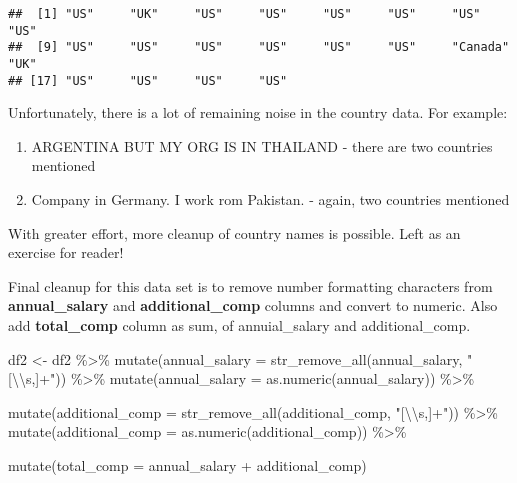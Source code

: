 \documentclass[
]{article}
\newenvironment{Shaded}{\begin{snugshade}}{\end{snugshade}}
\newcommand{\AttributeTok}[1]{\textcolor[rgb]{0.77,0.63,0.00}{#1}}
\newcommand{\DecValTok}[1]{\textcolor[rgb]{0.00,0.00,0.81}{#1}}
\newcommand{\FunctionTok}[1]{\textcolor[rgb]{0.00,0.00,0.00}{#1}}
\newcommand{\NormalTok}[1]{#1}
\newcommand{\OtherTok}[1]{\textcolor[rgb]{0.56,0.35,0.01}{#1}}
\newcommand{\SpecialCharTok}[1]{\textcolor[rgb]{0.00,0.00,0.00}{#1}}
\newcommand{\StringTok}[1]{\textcolor[rgb]{0.31,0.60,0.02}{#1}}
\providecommand{\tightlist}{%
  \setlength{\itemsep}{0pt}\setlength{\parskip}{0pt}}
\begin{document}
\begin{Shaded}
\end{Shaded}

\begin{verbatim}
##  [1] "US"     "UK"     "US"     "US"     "US"     "US"     "US"     "US"    
##  [9] "US"     "US"     "US"     "US"     "US"     "US"     "Canada" "UK"    
## [17] "US"     "US"     "US"     "US"
\end{verbatim}

Unfortunately, there is a lot of remaining noise in the country data.
For example:

\begin{enumerate}
\def\labelenumi{\arabic{enumi}.}
\tightlist
\item
  ARGENTINA BUT MY ORG IS IN THAILAND - there are two countries
  mentioned
\item
  Company in Germany. I work rom Pakistan. - again, two countries
  mentioned
\end{enumerate}

With greater effort, more cleanup of country names is possible. Left as
an exercise for reader!

Final cleanup for this data set is to remove number formatting
characters from \textbf{annual\_salary} and \textbf{additional\_comp}
columns and convert to numeric. Also add \textbf{total\_comp} column as
sum, of annuial\_salary and additional\_comp.

\begin{Shaded}
\begin{Highlighting}[]
\NormalTok{df2 }\OtherTok{\textless{}{-}}\NormalTok{ df2 }\SpecialCharTok{\%\textgreater{}\%}
    \FunctionTok{mutate}\NormalTok{(}\AttributeTok{annual\_salary =} \FunctionTok{str\_remove\_all}\NormalTok{(annual\_salary, }\StringTok{"[}\SpecialCharTok{\textbackslash{}\textbackslash{}}\StringTok{s,]+"}\NormalTok{)) }\SpecialCharTok{\%\textgreater{}\%}
    \FunctionTok{mutate}\NormalTok{(}\AttributeTok{annual\_salary =} \FunctionTok{as.numeric}\NormalTok{(annual\_salary)) }\SpecialCharTok{\%\textgreater{}\%}

    \FunctionTok{mutate}\NormalTok{(}\AttributeTok{additional\_comp =} \FunctionTok{str\_remove\_all}\NormalTok{(additional\_comp, }\StringTok{"[}\SpecialCharTok{\textbackslash{}\textbackslash{}}\StringTok{s,]+"}\NormalTok{)) }\SpecialCharTok{\%\textgreater{}\%}
    \FunctionTok{mutate}\NormalTok{(}\AttributeTok{additional\_comp =} \FunctionTok{as.numeric}\NormalTok{(additional\_comp)) }\SpecialCharTok{\%\textgreater{}\%}
    
    \FunctionTok{mutate}\NormalTok{(}\AttributeTok{total\_comp =}\NormalTok{ annual\_salary }\SpecialCharTok{+}\NormalTok{ additional\_comp) }
\end{Highlighting}
\end{Shaded}
\end{document}
